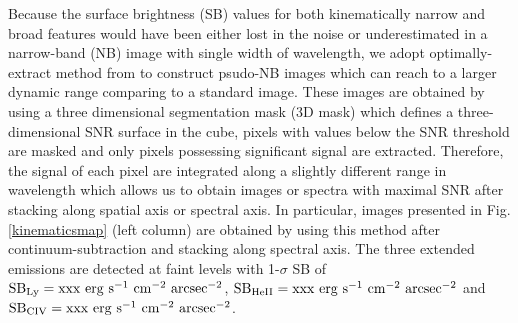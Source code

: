 Because the surface brightness (SB) values for both kinematically narrow and broad features would have been either lost in the noise or underestimated in a narrow-band (NB) image with single width of wavelength, we adopt optimally-extract method from \citet{borisova2016ubiquitous} to construct psudo-NB images which can reach to a larger dynamic range comparing to a standard image. These images are obtained by using a three dimensional segmentation mask (3D mask) which defines a three-dimensional SNR surface in the cube, pixels with values below the SNR threshold are masked and only pixels possessing significant signal are extracted. Therefore, the signal of each pixel are integrated along a slightly different range in wavelength which allows us to obtain images or spectra with maximal SNR after stacking along spatial axis or spectral axis. In particular, images presented in Fig. \ref{kinematicsmap} (left column) are obtained by using this method after continuum-subtraction and stacking along spectral axis. The three extended emissions are detected at faint levels with 1-$\sigma$ SB of $\rm SB_{Ly}=xxx \ erg \ s^{-1} \ cm^{-2} \ arcsec^{-2}$, $\rm SB_{HeII}=xxx \ erg \ s^{-1} \ cm^{-2} \ arcsec^{-2}$ and $\rm SB_{CIV}=xxx \ erg \ s^{-1} \ cm^{-2} \ arcsec^{-2}$. 


